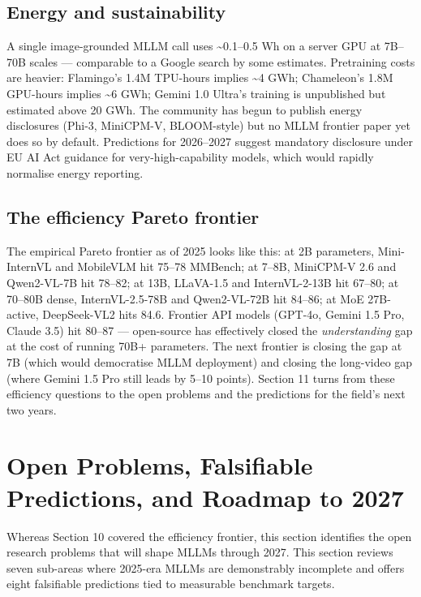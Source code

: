 \subsection{Energy and sustainability}\label{energy-and-sustainability}

A single image-grounded MLLM call uses \textasciitilde0.1--0.5 Wh on a server GPU at 7B--70B scales --- comparable to a Google search by some estimates. Pretraining costs are heavier: Flamingo's 1.4M TPU-hours implies \textasciitilde4 GWh; Chameleon's 1.8M GPU-hours implies \textasciitilde6 GWh; Gemini 1.0 Ultra's training is unpublished but estimated above 20 GWh. The community has begun to publish energy disclosures (Phi-3, MiniCPM-V, BLOOM-style) but no MLLM frontier paper yet does so by default. Predictions for 2026--2027 suggest mandatory disclosure under EU AI Act guidance for very-high-capability models, which would rapidly normalise energy reporting.

\subsection{The efficiency Pareto frontier}\label{the-efficiency-pareto-frontier}

The empirical Pareto frontier as of 2025 looks like this: at 2B parameters, Mini-InternVL and MobileVLM hit 75--78 MMBench; at 7--8B, MiniCPM-V 2.6 and Qwen2-VL-7B hit 78--82; at 13B, LLaVA-1.5 and InternVL-2-13B hit 67--80; at 70--80B dense, InternVL-2.5-78B and Qwen2-VL-72B hit 84--86; at MoE 27B-active, DeepSeek-VL2 hits 84.6. Frontier API models (GPT-4o, Gemini 1.5 Pro, Claude 3.5) hit 80--87 --- open-source has effectively closed the \emph{understanding} gap at the cost of running 70B+ parameters. The next frontier is closing the gap at 7B (which would democratise MLLM deployment) and closing the long-video gap (where Gemini 1.5 Pro still leads by 5--10 points). Section 11 turns from these efficiency questions to the open problems and the predictions for the field's next two years.

\section{Open Problems, Falsifiable Predictions, and Roadmap to 2027}\label{open-problems-falsifiable-predictions-and-roadmap-to-2027}

Whereas Section 10 covered the efficiency frontier, this section identifies the open research problems that will shape MLLMs through 2027. This section reviews seven sub-areas where 2025-era MLLMs are demonstrably incomplete and offers eight falsifiable predictions tied to measurable benchmark targets.

